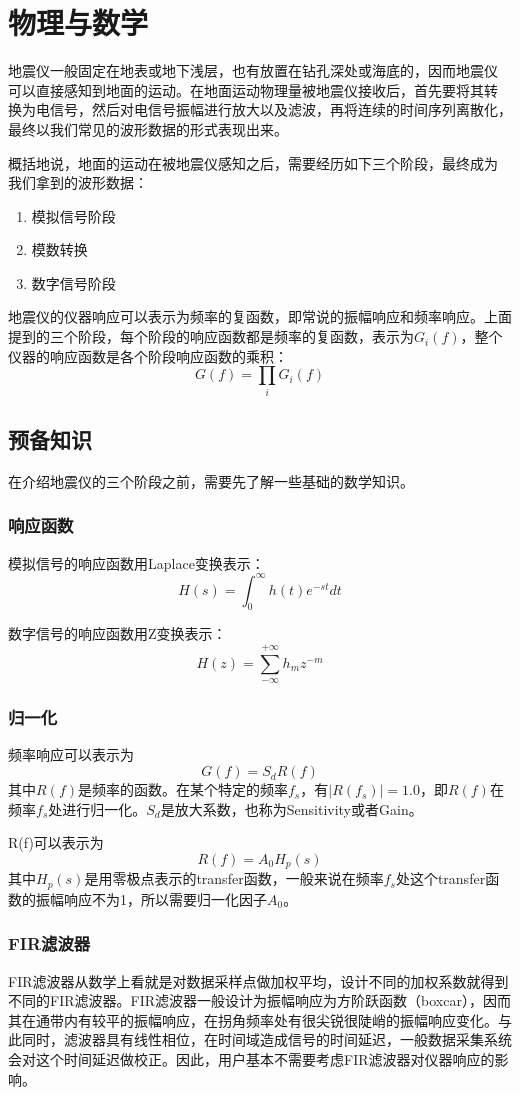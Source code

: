 \section{物理与数学}
地震仪一般固定在地表或地下浅层，也有放置在钻孔深处或海底的，因而地震仪
可以直接感知到地面的运动。在地面运动物理量被地震仪接收后，首先要将其转
换为电信号，然后对电信号振幅进行放大以及滤波，再将连续的时间序列离散化，
最终以我们常见的波形数据的形式表现出来。

概括地说，地面的运动在被地震仪感知之后，需要经历如下三个阶段，最终成为
我们拿到的波形数据：
\begin{enumerate}
\item 模拟信号阶段
\item 模数转换
\item 数字信号阶段
\end{enumerate}

地震仪的仪器响应可以表示为频率的复函数，即常说的振幅响应和频率响应。上面提到的三个阶段，每个阶段的响应函数都是频率的复函数，表示为$G_i(f)$，整个仪器的响应函数是各个阶段响应函数的乘积：
\[
    G(f)=\prod_i G_i(f)
\]

\subsection{预备知识}
在介绍地震仪的三个阶段之前，需要先了解一些基础的数学知识。
\subsubsection{响应函数}
模拟信号的响应函数用Laplace变换表示：
\[
    H(s)=\int_0^{\infty}h(t)e^{-st}dt
\]

数字信号的响应函数用Z变换表示：
\[
    H(z)=\sum_{-\infty}^{+\infty}h_m z^{-m}
\]

\subsubsection{归一化}
频率响应可以表示为
\[
    G(f)=S_d R(f)
\]
其中$R(f)$是频率的函数。在某个特定的频率$f_s$，有$|R(f_s)|=1.0$，即$R(f)$在频率$f_s$处进行归一化。$S_d$是放大系数，也称为Sensitivity或者Gain。

R(f)可以表示为
\[
    R(f)= A_0 H_p(s)
\]
其中$H_p(s)$是用零极点表示的transfer函数，一般来说在频率$f_s$处这个transfer函数的振幅响应不为1，所以需要归一化因子$A_0$。

\subsubsection{FIR滤波器}
FIR滤波器从数学上看就是对数据采样点做加权平均，设计不同的加权系数就得到不同的FIR滤波器。FIR滤波器一般设计为振幅响应为方阶跃函数（boxcar），因而其在通带内有较平的振幅响应，在拐角频率处有很尖锐很陡峭的振幅响应变化。与此同时，滤波器具有线性相位，在时间域造成信号的时间延迟，一般数据采集系统会对这个时间延迟做校正。因此，用户基本不需要考虑FIR滤波器对仪器响应的影响。

